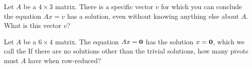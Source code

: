 \endedxproblem




Let $A$ be a $4\times 3$ matrix.  There is a specific 
vector $v$ for which you can conclude the equation $Ax = v$ has a solution, even without knowing
anything else about $A$.  What is this vector $v$?  







\endedxproblem




\endedxvertical











Let $A$ be a $6\times 4$ matrix.  The equation $Ax = \mathbf{0}$ has the solution $x = \mathbf{0}$, which we
call the  {}  If there are no solutions other than the trivial solutions,
how many pivots must $A$ have when row-reduced?  



